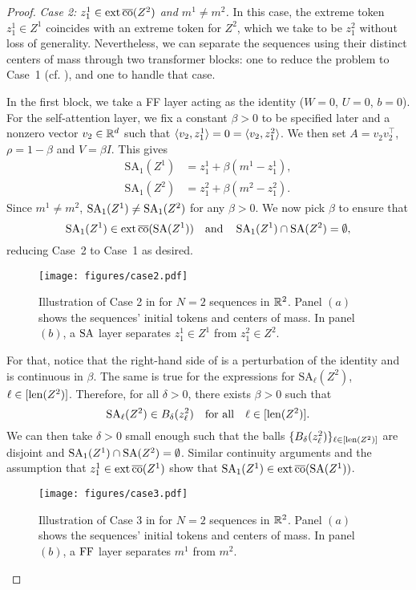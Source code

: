 \documentclass[11pt,a4paper]{amsart}
\begin{document}
\begin{proof}
\textit{Case 2: $z_1^1 \in \operatorname{ext}\operatorname{\overline{co}} (Z^2)$ and $m^1 \neq m^2$.} 
In this case, the extreme token $z_1^1 \in Z^1$ coincides with an extreme token for $Z^2$, which we take to be $z_1^2$ without loss of generality. Nevertheless, we can separate the sequences using their distinct centers of mass through two transformer blocks: one to reduce the problem to Case~1 (cf. ), and one to handle that case. 

In the first block, we take a FF layer acting as the identity ($W=0$, $U=0$, $b=0$). For the self-attention layer, we fix a constant $\beta > 0$ to be specified later and a nonzero vector $v_2\in \mathbb{R}^d$ such that $\langle v_2, z_1^1 \rangle = 0 = \langle v_2, z_1^2 \rangle$. We then set $A = v_2 v_2^\top$, $\rho = 1-\beta$ and $V = \beta I$. This gives
\begin{subequations}
    \begin{align}
    \mathrm{SA}_1(Z^1) &= z_1^1 +  \beta (m^1 - z_1^1), \\ 
    \label{eq:SA_case2}
    \mathrm{SA}_1(Z^2) &= z_1^2 + \beta (m^2 - z_1^2).
\end{align}
\end{subequations}
Since $m^{1} \neq m^{2}$, $\operatorname{\mathrm{SA}}_1(Z^1) \neq \operatorname{\mathrm{SA}}_1(Z^2)$ for any $\beta>0$. We now pick $\beta$ to ensure that 
\begin{equation}
   \operatorname{\mathrm{SA}}_1(Z^1) \in \operatorname{ext}\operatorname{\overline{co}} (\operatorname{\mathrm{SA}}(Z^1)) \quad \text{and} \quad \operatorname{\mathrm{SA}}_1(Z^1) \cap \operatorname{\mathrm{SA}} (Z^2) = \emptyset, 
\end{equation}
reducing Case~2 to Case~1 as desired.
\begin{figure}
    \centering
    \texttt{[image: figures/case2.pdf]}
    \caption{Illustration of Case 2 in  for $N=2$ sequences in $\mathbb{R}^2$. Panel $(a)$ shows the sequences' initial tokens and centers of mass. In panel $(b)$, a $\operatorname{\mathrm{SA}}$ layer separates $z_1^1\in Z^1$ from $z_1^2\in Z^2$.}
    \label{fig:case2}
\end{figure}
For that, notice that the right-hand side of  is a perturbation of the identity and is continuous in $\beta$. The same is true for the expressions for $\mathrm{SA}_\ell(Z^2)$, $\ell \in [\operatorname{len} (Z^2)]$. Therefore, for all $\delta > 0$, there exists $\beta > 0$ such that 
\begin{equation}
    \operatorname{\mathrm{SA}}_\ell (Z^2) \in B_\delta (z_\ell^2) \quad \text{for all} \quad \ell \in [\operatorname{len} (Z^2)]. 
\end{equation}
We can then take $\delta > 0$ small enough such that the balls $\{B_\delta(z_\ell^2)\}_{\ell\in [\operatorname{len} (Z^2)]}$ are disjoint and $\operatorname{\mathrm{SA}}_1(Z^1) \cap \operatorname{\mathrm{SA}} (Z^2) = \emptyset$. Similar continuity arguments and the assumption that $z_1^1 \in \operatorname{ext} \operatorname{\overline{co}} (Z^1)$ show that $\operatorname{\mathrm{SA}}_1(Z^1) \in \operatorname{ext}\operatorname{\overline{co}} (\operatorname{\mathrm{SA}}(Z^1))$.
\begin{figure}
    \centering
    \texttt{[image: figures/case3.pdf]}
    \caption{Illustration of Case 3 in  for $N=2$ sequences in $\mathbb{R}^2$. Panel $(a)$ shows the sequences' initial tokens and centers of mass. In panel $(b)$, a $\operatorname{\mathrm{FF}}$ layer separates $m^1$ from $m^2$.}
    \label{fig:case3}
\end{figure}


\end{proof}
\end{document}
